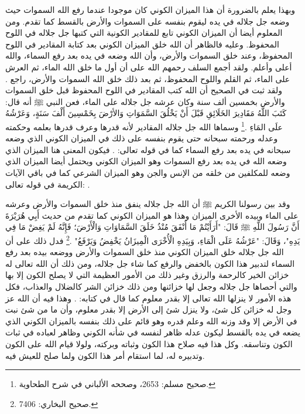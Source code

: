 وبهذا يعلم بالضرورة أن هذا الميزان الكوني كان موجودا عندما رفع الله السموات حيث وضعه جل جلاله في يده ليقوم بنفسه على السموات والأرض بالقسط كما تقدم. ومن المعلوم أيضا أن الميزان الكوني تابع للمقادير الكونية التي كتبها جل جلاله في اللوح المحفوظ. وعليه فالظاهر أن الله خلق الميزان الكوني بعد كتابة المقادير في اللوح المحفوظ، وعند خلق السموات والأرض، وأن الله وضعه في يده بعد رفع السماء، والله أعلى وأعلم. ولقد أجمع السلف رحمهم الله على أن أول ما خلق الله الماء، ثم العرش على الماء، ثم القلم واللوح المحفوظ، ثم بعد ذلك خلق الله السموات والأرض، راجع . ولقد ثبت في الصحيح أن الله كتب المقادير في اللوح المحفوظ قبل خلق السموات والأرض بخمسين ألف سنة وكان عرشه جل جلاله على الماء، فعن النبي ﷺ أنه قال:  كَتَبَ اللَّهُ مَقَادِيرَ الخَلَائِقِ قَبْلَ أَنْ يَخْلُقَ السَّمَوَاتِ وَالأرْضَ بِخَمْسِينَ أَلْفَ سَنَةٍ، وَعَرْشُهُ علَى المَاءِ \href{https://shamela.ws/book/1727/6683#p2}{\faExternalLink} \cite{muslim}.\footnote{صحيح مسلم: 2653، وصححه الألباني في شرح الطحاوية.} وسماها الله جل جلاله المقادير لأنه قدرها وعرف قدرها بعلمه وحكمته وعدله ورحمته سبحانه حتى يقوم بنفسه على ذلك في الميزان الكوني الذي وضعه سبحانه في يده بعد رفع السماء كما في قوله تعالى: 
\quranayah*[55][7]{\footnotesize \surahname*[55]}. فيكون المعنى هنا الميزان الذي وضعه الله في يده بعد رفع السموات وهو الميزان الكوني ويحتمل أيضا الميزان الذي وضعه للمكلفين من خلقه من الإنس والجن وهو الميزان الشرعي كما في باقي الآيات الكريمة في قوله تعالى: 
\quranayah*[55][8-9]{\footnotesize \surahname*[55]}. 

وقد بين رسولنا الكريم ﷺ أن الله جل جلاله ينفق منذ خلق السموات والأرض وعرشه على الماء وبيده الأخرى الميزان وهذا هو الميزان الكوني كما تقدم من حديث أَبِي هُرَيْرَةَ أَنَّ رَسُولَ اللَّهِ ﷺ قَالَ: "أَرَأَيْتُمْ مَا أَنْفَقَ مُنْذُ خَلَقَ السَّمَاوَاتِ وَالْأَرْضَ؛ فَإِنَّهُ لَمْ يَغِضْ مَا فِي يَدِهِ"، وَقَالَ: "عَرْشُهُ عَلَى الْمَاءِ، وَبِيَدِهِ الْأُخْرَى الْمِيزَانُ يَخْفِضُ وَيَرْفَعُ" \href{https://shamela.ws/book/1284/4620#p2}{\faExternalLink} \cite{bukhari}.\footnote{صحيح البخاري: 7406.} فدل ذلك على أن الله جل جلاله خلق الميزان الكوني منذ خلق السموات والأرض ووضعه بيده بعد رفع السماء لتدبير هذا الكون بالخفض والرفع كما شاء جل جلاله، ومن ذلك أن الله تعالى له خزائن الخير كالرحمة والرزق وغير ذلك من الأمور العظيمة التي لا يصلح الكون إلا بها والتي أحصاها جل جلاله وجعل لها خزائنها ومن ذلك خزائن الشر كالضلال والعذاب، فكل هذه الأمور لا ينزلها الله تعالى إلا بقدر معلوم كما قال في كتابه: 
\quranayah*[15][19-21]{\footnotesize \surahname*[15]}. وهذا فيه أن الله عز وجل له خزائن كل شئ، ولا ينزل شئ إلى الأرض إلا بقدر معلوم، وأن ما من شئ نبت في الأرض إلا وقد وزنه الله وعلم قدره وهو قائم على ذلك بنفسه بالميزان الكوني الذي يضعه في يده بالقسط ليكون عدله ظاهر لنفسه في شأنه الكوني وظاهر لعباده في ثبات الكون وتناسقه. وكل هذا فيه صلاح هذا الكون وثباته وبركته، ولولا قيام الله على الكون وتدبيره له، لما استقام أمر هذا الكون ولما صلح للعيش فيه.

